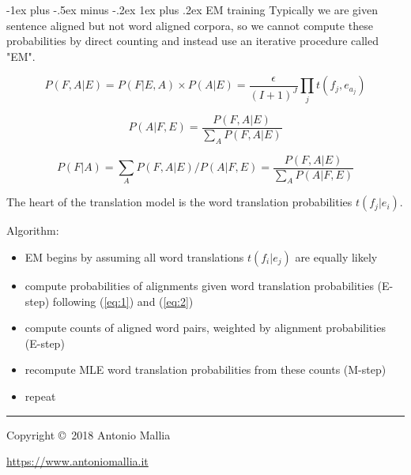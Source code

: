 \documentclass[10pt,landscape]{article}
\makeatletter
\renewcommand{\subsubsection}{\@startsection{subsubsection}{3}{0mm}%
                                {-1ex plus -.5ex minus -.2ex}%
                                {1ex plus .2ex}%
                                {\normalfont\small\bfseries}}
\makeatother
\begin{document}
\begin{multicols}{3}
\subsubsection{EM training}
Typically we are given sentence aligned but not word aligned corpora, so we cannot compute these probabilities by direct counting and instead use an iterative procedure called "EM".

\begin{equation} \label{eq:1}
P(F, A | E) = P(F| E,A) \times P(A|E)
			= \frac{\epsilon}{(I+1)^J} \prod_j t(f_j, e_{a_j})
\end{equation}

\begin{equation} \label{eq:2}
P(A| F, E) =\frac{P(F, A | E)}{\sum_A P(F, A|E)}
\end{equation}

\begin{equation*}
P(F|A) = \sum_A P(F, A | E) / P(A|F,E) = \frac{P(F, A | E)}{\sum_A P(A|F,E)}
\end{equation*}

The heart of the translation model is the word translation probabilities $t(f_j | e_i)$.


Algorithm:
\begin{itemize}
	\item EM begins by assuming all word translations $t(f_i | e_j)$ are equally likely
	\item compute probabilities of alignments given word translation probabilities (E-step) following (\ref{eq:1}) and (\ref{eq:2})
	\item compute counts of aligned word pairs, weighted by alignment probabilities (E-step) 
	\item recompute MLE word translation probabilities from these counts (M-step)
	\item repeat
\end{itemize}



\rule{0.3\linewidth}{0.25pt}
\scriptsize

Copyright \copyright\ 2018 Antonio Mallia

\href{https://www.antoniomallia.it}{https://www.antoniomallia.it}


\end{multicols}
\end{document}

